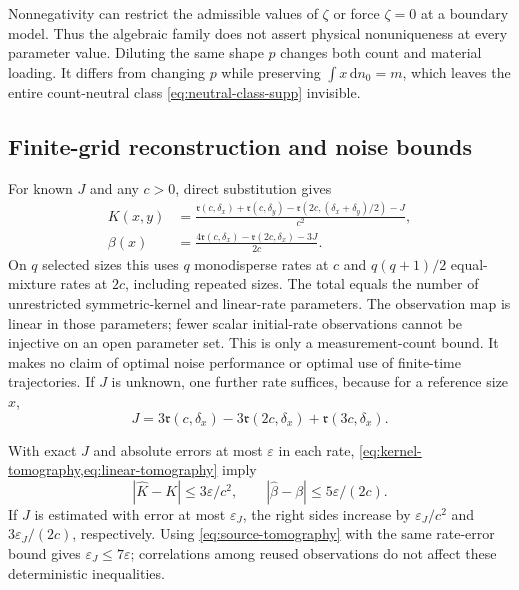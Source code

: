 \documentclass[11pt]{article}
\numberwithin{equation}{section}
\theoremstyle{definition}
\theoremstyle{remark}
\newcommand{\dd}{\,\mathrm d}
\newcommand{\1}{\mathbf 1}
\begin{document}
Nonnegativity can restrict the admissible values of $\zeta$ or force
$\zeta=0$ at a boundary model. Thus the algebraic family does not assert
physical nonuniqueness at every parameter value. Diluting the same shape
$p$ changes both count and material loading. It differs from changing
$p$ while preserving $\int x\dd n_0=m$, which leaves the entire count-neutral
class \eqref{eq:neutral-class-supp} invisible.

\subsection{Finite-grid reconstruction and noise bounds}

For known $J$ and any $c>0$, direct substitution gives
\begin{align}
 K(x,y)&=\frac{\mathfrak r(c,\delta_x)+\mathfrak r(c,\delta_y)
 -\mathfrak r(2c,(\delta_x+\delta_y)/2)-J}{c^2},
 \label{eq:kernel-tomography}\\
 \beta(x)&=\frac{4\mathfrak r(c,\delta_x)
                 -\mathfrak r(2c,\delta_x)-3J}{2c}.
 \label{eq:linear-tomography}
\end{align}
On $q$ selected sizes this uses $q$ monodisperse rates at $c$ and
$q(q+1)/2$ equal-mixture rates at $2c$, including repeated sizes.
The total equals the number of unrestricted symmetric-kernel and
linear-rate parameters. The observation map is linear in those
parameters; fewer scalar initial-rate observations cannot be injective
on an open parameter set. This is only a measurement-count bound.
It makes no claim of optimal noise performance or optimal use of
finite-time trajectories. If $J$ is unknown, one further rate suffices,
because for a reference size $x$,
\begin{equation}
 J=3\mathfrak r(c,\delta_x)-3\mathfrak r(2c,\delta_x)
                  +\mathfrak r(3c,\delta_x).
 \label{eq:source-tomography}
\end{equation}

With exact $J$ and absolute errors at most $\varepsilon$ in each rate,
\cref{eq:kernel-tomography,eq:linear-tomography} imply
\begin{equation}
 |\widehat K-K|\leq3\varepsilon/c^2,\qquad
 |\widehat\beta-\beta|\leq5\varepsilon/(2c).
 \label{eq:rate-noise}
\end{equation}
If $J$ is estimated with error at most $\varepsilon_J$, the right sides
increase by $\varepsilon_J/c^2$ and $3\varepsilon_J/(2c)$, respectively.
Using \eqref{eq:source-tomography} with the same rate-error bound gives
$\varepsilon_J\leq7\varepsilon$; correlations among reused observations
do not affect these deterministic inequalities.
\end{document}
